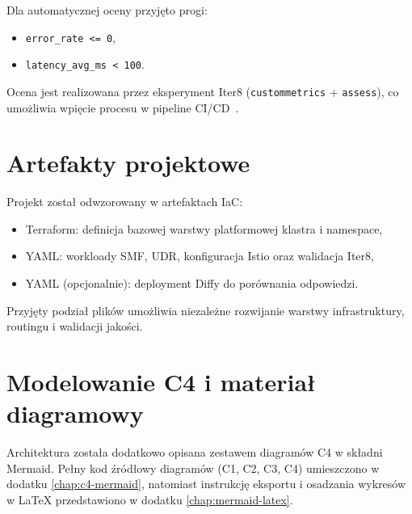 Dla automatycznej oceny przyjęto progi:
\begin{itemize}
    \item \texttt{error\_rate <= 0},
    \item \texttt{latency\_avg\_ms < 100}.
\end{itemize}

Ocena jest realizowana przez eksperyment Iter8 (\texttt{custommetrics} + \texttt{assess}), co umożliwia wpięcie procesu w pipeline CI/CD~\cite{iter8Docs}.

\section{Artefakty projektowe}
Projekt został odwzorowany w artefaktach IaC:
\begin{itemize}
    \item Terraform: definicja bazowej warstwy platformowej klastra i namespace,
    \item YAML: workloady SMF, UDR, konfiguracja Istio oraz walidacja Iter8,
    \item YAML (opcjonalnie): deployment Diffy do porównania odpowiedzi.
\end{itemize}

Przyjęty podział plików umożliwia niezależne rozwijanie warstwy infrastruktury, routingu i walidacji jakości.

\section{Modelowanie C4 i materiał diagramowy}
Architektura została dodatkowo opisana zestawem diagramów C4 w składni Mermaid. Pełny kod źródłowy diagramów (C1, C2, C3, C4) umieszczono w dodatku \ref{chap:c4-mermaid}, natomiast instrukcję eksportu i osadzania wykresów w LaTeX przedstawiono w dodatku \ref{chap:mermaid-latex}.
